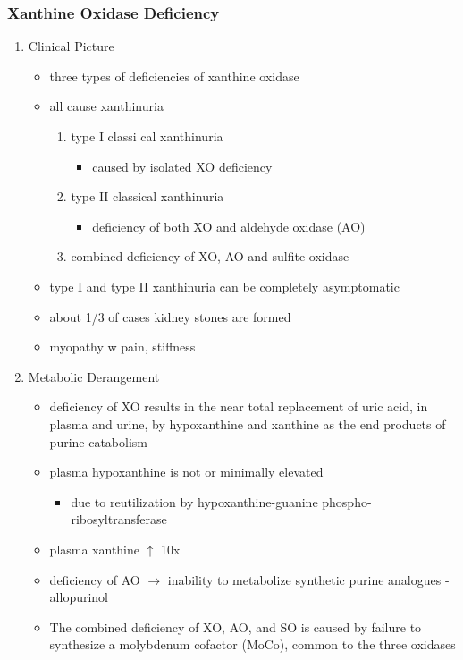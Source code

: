 \documentclass{scrartcl}
\begin{document}
\subsubsection{Xanthine Oxidase Deficiency}
\label{sec:orgc869ee1}
\begin{enumerate}
\item Clinical Picture
\label{sec:org9b22507}
\begin{itemize}
\item three types of deficiencies of xanthine oxidase
\item all cause xanthinuria
\begin{enumerate}
\item type I classi cal xanthinuria
\begin{itemize}
\item caused by isolated XO deficiency
\end{itemize}
\item type II classical xanthinuria
\begin{itemize}
\item deficiency of both XO and aldehyde oxidase (AO)
\end{itemize}
\item combined deficiency of XO, AO and sulfite oxidase
\end{enumerate}
\item type I and type II xanthinuria can be completely asymptomatic
\item about 1/3 of cases kidney stones are formed
\item myopathy w pain, stiffness
\end{itemize}

\item Metabolic Derangement
\label{sec:org803efb1}
\begin{itemize}
\item deficiency of XO results in the near total replacement of uric acid,
in plasma and urine, by hypoxanthine and xanthine as the end
products of purine catabolism
\item plasma hypoxanthine is not or minimally elevated
\begin{itemize}
\item due to reutilization by hypoxanthine-guanine phospho-ribosyltransferase
\end{itemize}
\item plasma xanthine \(\uparrow\) 10x

\item deficiency of AO \(\to\) inability to metabolize synthetic purine
analogues - allopurinol
\item The combined deficiency of XO, AO, and SO is caused by failure to
synthesize a molybdenum cofactor (MoCo), common to the three
oxidases
\end{itemize}


\end{enumerate}
\end{document}

